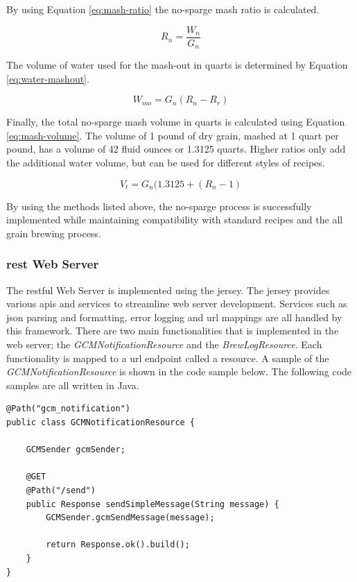 \documentclass{article}
\begin{document}
\noindent By using Equation \ref{eq:mash-ratio} the no-\gls{sparge} \gls{mash} ratio is calculated.

\begin{equation}
R_{n} = \frac{W_{n}}{G_{n}}
\label{eq:mash-ratio}
\end{equation}

\noindent The volume of water used for the \gls{mash}-out in quarts is determined by Equation \ref{eq:water-mashout}.

\begin{equation}
W_{mo} = G_{n}(R_{n} - R_{r})
\label{eq:water-mashout}
\end{equation}

\noindent Finally, the total no-\gls{sparge} \gls{mash} volume in quarts is calculated using Equation \ref{eq:mash-volume}.  The volume of 1 pound of dry grain, mashed at 1 quart per pound, has a volume of 42 fluid ounces or 1.3125 quarts. Higher ratios only add the additional water volume, but can be used for different styles of recipes.

\begin{equation}
V_{t} = G_{n}(1.3125 + (R_{n} - 1)
\label{eq:mash-volume}
\end{equation}

By using the methods listed above, the no-\gls{sparge} process is successfully implemented while maintaining compatibility with standard recipes and the all grain brewing process.

\subsubsection{\gls{rest} Web Server}
The \gls{rest}ful Web Server is implemented using the \gls{jersey}. The \gls{jersey} provides various \glspl{api} and services to streamline web server development. Services such as \gls{json} parsing and formatting, error logging and \gls{url} mappings are all handled by this framework. There are two main functionalities that is implemented in the web server; the \textit{GCMNotificationResource} and the \textit{BrewLogResource}. Each functionality is mapped to a \gls{url} endpoint called a \gls{resource}. A sample of the \textit{GCMNotificationResource} is shown in the code sample below. The following code samples are all written in Java.

\begin{lstlisting}
@Path("gcm_notification")
public class GCMNotificationResource {

    GCMSender gcmSender;

    @GET
    @Path("/send")
    public Response sendSimpleMessage(String message) {
        GCMSender.gcmSendMessage(message);

        return Response.ok().build();
    }
}
\end{lstlisting}
\end{document}
